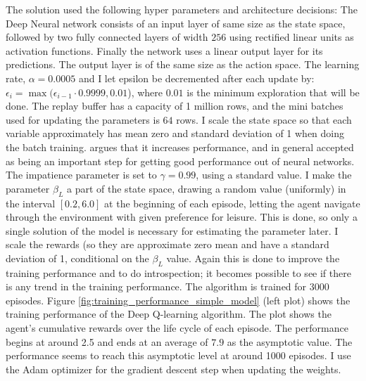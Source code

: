 The solution used the following hyper parameters and architecture decisions: The Deep Neural network consists of an input layer of same size as the state space, followed by two fully connected layers of width $256$ using rectified linear units as activation functions. Finally the network uses a linear output layer for its predictions. The output layer is of the same size as the action space. The learning rate, $\alpha=0.0005$ and I let epsilon be decremented after each update by: $\epsilon_i = \max (\epsilon_{i-1} \cdot 0.9999, 0.01$), where $0.01$ is the minimum exploration that will be done. The replay buffer has a capacity of 1 million rows, and the mini batches used for updating the parameters is $64$ rows. I scale the state space so that each variable approximately has mean zero and standard deviation of 1 when doing the batch training. \textcite{goodfellow_deep_2016} argues that it increases performance, and in general accepted as being an important step for getting good performance out of neural networks. The impatience parameter is set to $\gamma=0.99$, using a standard value. I make the parameter $\beta_L$ a part of the state space, drawing a random value (uniformly) in the interval $[0.2, 6.0]$ at the beginning of each episode, letting the agent navigate through the environment with given preference for leisure. This is done, so only a single solution of the model is necessary for estimating the parameter later. I scale the rewards (so they are approximate zero mean and have a standard deviation of 1, conditional on the $\beta_L$ value. Again this is done to improve the training performance and to do introspection; it becomes possible to see if there is any trend in the training performance. The algorithm is trained for 3000 episodes. Figure \ref{fig:training_performance_simple_model}  (left plot) shows the training performance of the Deep Q-learning algorithm. The plot shows the agent's cumulative rewards over the life cycle of each episode. The performance begins at around 2.5 and ends at an average of $7.9$ as the asymptotic value. The performance seems to reach this asymptotic level at around 1000 episodes. I use the Adam optimizer for the gradient descent step when updating the weights.

